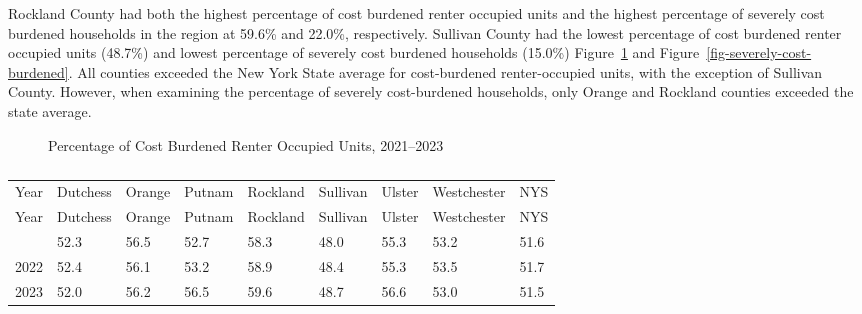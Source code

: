 \documentclass[
  english,
  letterpaper,
]{report}
\begin{document}
Rockland County had both the highest percentage of cost burdened renter
occupied units and the highest percentage of severely cost burdened
households in the region at 59.6\% and 22.0\%, respectively. Sullivan
County had the lowest percentage of cost burdened renter occupied units
(48.7\%) and lowest percentage of severely cost burdened households
(15.0\%) Figure~\ref{fig-cost-burdened-renters} and
Figure~\ref{fig-severely-cost-burdened}. All counties exceeded the New
York State average for cost-burdened renter-occupied units, with the
exception of Sullivan County. However, when examining the percentage of
severely cost-burdened households, only Orange and Rockland counties
exceeded the state average.

\begin{figure}


\caption{\label{fig-cost-burdened-renters}Percentage of Cost Burdened
Renter Occupied Units, 2021--2023}

\end{figure}%

\begin{longtable}[]{@{}lllllllll@{}}

\caption{\label{tbl-cost-burdened-renters}Percentage of Cost Burdened
Renter Occupied Units, 2021--2023}

\tabularnewline

\caption{}\label{T_4b129}\tabularnewline
\toprule\noalign{}
Year & Dutchess & Orange & Putnam & Rockland & Sullivan & Ulster &
Westchester & NYS \\
\midrule\noalign{}
\endfirsthead
\toprule\noalign{}
Year & Dutchess & Orange & Putnam & Rockland & Sullivan & Ulster &
Westchester & NYS \\
\midrule\noalign{}
\endhead
\bottomrule\noalign{}
\endlastfoot
2021 & 52.3 & 56.5 & 52.7 & 58.3 & 48.0 & 55.3 & 53.2 & 51.6 \\
2022 & 52.4 & 56.1 & 53.2 & 58.9 & 48.4 & 55.3 & 53.5 & 51.7 \\
2023 & 52.0 & 56.2 & 56.5 & 59.6 & 48.7 & 56.6 & 53.0 & 51.5 \\

\end{longtable}
\end{document}
